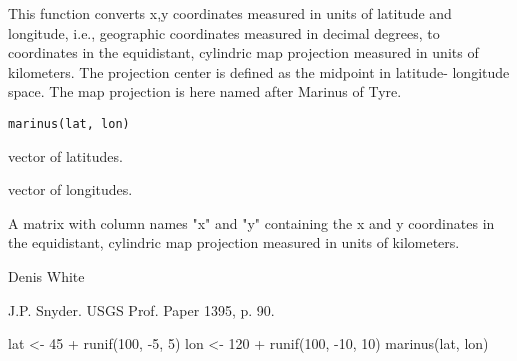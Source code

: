 \begin{Description}\relax
This function converts x,y coordinates measured in units of latitude and 
longitude, i.e., geographic coordinates measured in decimal degrees, to 
coordinates in the equidistant, cylindric map projection measured in units of
kilometers.  The projection center is defined as the midpoint in latitude-
longitude space.  The map projection is here named after Marinus of Tyre.
\end{Description}
\begin{Usage}
\begin{verbatim}
marinus(lat, lon)
\end{verbatim}
\end{Usage}
\begin{Arguments}
\begin{ldescription}
\item[\code{lat}] vector of latitudes.
\item[\code{lon}] vector of longitudes.
\end{ldescription}
\end{Arguments}
\begin{Value}
A matrix with column names "x" and "y" containing the x and y coordinates 
in the equidistant, cylindric map projection measured in units of kilometers.
\end{Value}
\begin{Author}\relax
Denis White 
\end{Author}
\begin{References}\relax
J.P. Snyder. USGS Prof. Paper 1395, p. 90.
\end{References}
\begin{Examples}
\begin{ExampleCode}
lat <- 45 + runif(100, -5, 5)
lon <- 120 + runif(100, -10, 10)
marinus(lat, lon)
\end{ExampleCode}
\end{Examples}

